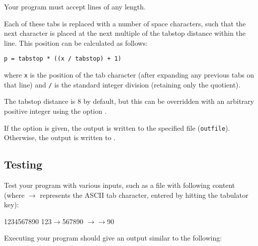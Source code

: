 Your program must accept lines of any length.

Each of these tabs is replaced with a number of space characters,
such that the next character
is placed at the next multiple of the tabstop distance within the line.
This position can be calculated as follows:

\verb|p = tabstop * ((x / tabstop) + 1)|

where \verb|x| is the position of the tab character
(after expanding any previous tabs on that line)
and \verb|/| is the standard integer division (retaining only the quotient).

The tabstop distance is 8 by default,
but this can be overridden with an arbitrary positive integer
using the option .

If the option  is given,
the output is written to the specified file (\verb|outfile|).
Otherwise, the output is written to .

\subsection*{Testing}

Test your program with various inputs,
such as a file  with following content
(where \(\to\) represents the ASCII tab character,
entered by hitting the tabulator key):

\begin{osuefmtcode}
    1234567890
    123\(\to\)567890
    \(\to\)\(\to\)90
\end{osuefmtcode}

Executing your program should give an output similar to the following:


\osueguidelinesone


